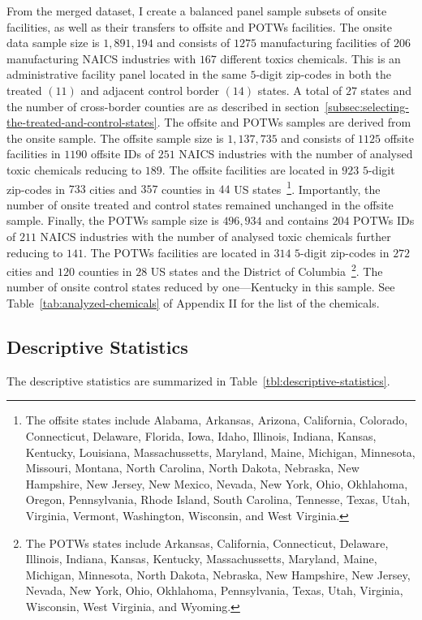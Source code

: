 \documentclass[12pt, english]{article}
\begin{document}
    From the merged dataset, I create a balanced panel sample subsets of onsite facilities, as well as their transfers to offsite and POTWs facilities. The onsite data sample size is $1,891,194$ and consists of $1275$ manufacturing facilities of $206$ manufacturing NAICS industries with $167$ different toxics chemicals. This is an administrative facility panel located in the same $5$-digit zip-codes in both the treated $(11)$ and adjacent control border $(14)$ states. A total of $27$ states and the number of cross-border counties are as described in section~\ref{subsec:selecting-the-treated-and-control-states}. The offsite and POTWs samples are derived from the onsite sample. The offsite sample size is $1,137,735$ and consists of $1125$ offsite facilities in $1190$ offsite IDs of $251$ NAICS industries with the number of analysed toxic chemicals reducing to $189$. The offsite facilities are located in $923$ $5$-digit zip-codes in $733$ cities and $357$ counties in $44$ US states~\footnote{\tiny The offsite states include Alabama, Arkansas, Arizona, California, Colorado, Connecticut, Delaware, Florida, Iowa, Idaho, Illinois, Indiana, Kansas, Kentucky, Louisiana, Massachussetts, Maryland, Maine, Michigan, Minnesota, Missouri, Montana, North Carolina, North Dakota, Nebraska, New Hampshire, New Jersey, New Mexico, Nevada, New York, Ohio, Okhlahoma, Oregon, Pennsylvania, Rhode Island, South Carolina, Tennesse, Texas, Utah, Virginia, Vermont, Washington, Wisconsin, and West Virginia.}. Importantly, the number of onsite treated and control states remained unchanged in the offsite sample. Finally, the POTWs sample size is $496,934$ and contains $204$ POTWs IDs of $211$ NAICS industries with the number of analysed toxic chemicals further reducing to $141$. The POTWs facilities are located in $314$ $5$-digit zip-codes in $272$ cities and $120$ counties in $28$ US states and the District of Columbia~\footnote{\tiny The POTWs states include Arkansas, California, Connecticut, Delaware, Illinois, Indiana, Kansas, Kentucky, Massachussetts, Maryland, Maine, Michigan, Minnesota, North Dakota, Nebraska, New Hampshire, New Jersey, Nevada, New York, Ohio, Okhlahoma, Pennsylvania, Texas, Utah, Virginia, Wisconsin, West Virginia, and Wyoming.}. The number of onsite control states reduced by one---Kentucky in this sample. See Table~\ref{tab:analyzed-chemicals} of Appendix II for the list of the chemicals.

    \subsection{Descriptive Statistics}\label{subsec:descriptive-statistics}
    The descriptive statistics are summarized in Table~\ref{tbl:descriptive-statistics}.
\end{document}
